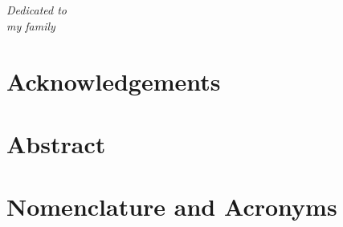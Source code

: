 \documentclass[12pt,a4paper]{book}
\begin{document}


$\ $
\thispagestyle{empty}  %
\chapter*{}



\begin{flushright}
\textit{Dedicated to \\
my family}
\end{flushright} 

\newpage

\chapter*{Acknowledgements} \label{chap:Acknowledgements}  %
{} %


\newpage

\chapter*{Abstract} \label{chap:Abstract}
{} %



\newpage

\chapter*{Nomenclature and Acronyms} \label{chap:NomenclatureAcronyms}  %
{} %

\end{document}
